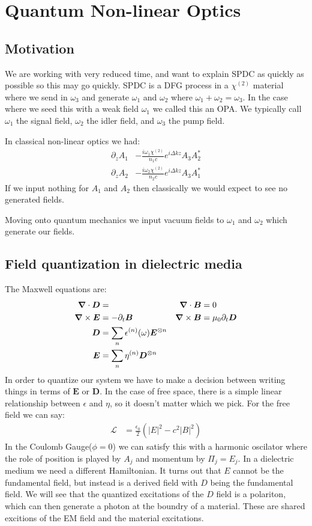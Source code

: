\section{Quantum Non-linear Optics}
\subsection{Motivation}
We are working with very reduced time, and want to explain SPDC as quickly as possible so this may go quickly. SPDC is a DFG process in a $\chi^{(2)}$ material where we send in $\omega_3$ and generate $\omega_1$ and $\omega_2$ where $\omega_1 + \omega_2 = \omega_3$.
In the case where we seed this with a weak field $\omega_1$ we called this an OPA. We typically call $\omega_1$ the signal field, $\omega_2$ the idler field, and $\omega_3$ the pump field. 

In classical non-linear optics we had:
\begin{align*}
	\partial_z A_1 &- \frac{i\omega_1 \chi^{(2)}}{n_1 c}e^{i\Delta k z} A_3 A_2^* \\
	\partial_z A_2 &- \frac{i\omega_2 \chi^{(2)}}{n_2 c}e^{i\Delta k z} A_3 A_1^*
\end{align*}
If we input nothing for $A_1$ and $A_2$ then classically we would expect to see no generated fields.

Moving onto quantum mechanics we input vacuum fields to $\omega_1$ and $\omega_2$ which generate our fields.
\subsection{Field quantization in dielectric media}
The Maxwell equations are:
\begin{align*}
	\bm{\nabla}\cdot\bm{D} &= & \bm{\nabla}\cdot\bm{B} &= 0 \\
	\bm{\nabla}\times\bm{E} &= -\partial_t \bm{B} & \bm{\nabla}\times\bm{B} &= \mu_0 \partial_t\bm{D} \\
	\bm{D} &= \sum_n \epsilon^{(n)}(\omega) \bm{E}^{\otimes n} \\
	\bm{E} &= \sum_n \eta^{(n)} \bm{D}^{\otimes n}
\end{align*}
In order to quantize our system we have to make a decision between writing things in terms of $\bm{E}$ or $\bm{D}$. In the case of free space, there is a simple linear relationship between $\epsilon$ and $\eta$, so it doesn't matter which we pick.
For the free field we can say:
\begin{align*}
	\mathcal{L} &= \frac{\epsilon_0}{2} \left(|E|^2 - c^2|B|^2\right)
\end{align*}
In the Coulomb Gauge($\phi=0$) we can satisfy this with a harmonic oscilator where the role of position is played by $A_j$ and momentum by $\Pi_j = E_j$. In a dielectric medium we need a different Hamiltonian.
It turns out that $E$ cannot be the fundamental field, but instead is a derived field with $D$ being the fundamental field. We will see that the quantized excitations of the $D$ field is a polariton, which can then generate a photon at the boundry of a material.
These are shared excitions of the EM field and the material excitations.

